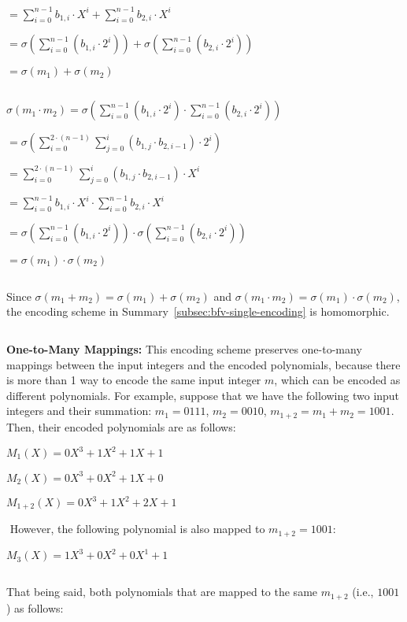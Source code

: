 $= \sum\limits_{i=0}^{n-1} b_{1,i}\cdot X^i + \sum\limits_{i=0}^{n-1} b_{2,i}\cdot X^i$

$= \sigma\left( \sum\limits_{i=0}^{n-1} (b_{1,i} \cdot 2^i)\right) + \sigma\left( \sum\limits_{i=0}^{n-1} (b_{2,i} \cdot 2^i) \right)$

$= \sigma(m_1) + \sigma(m_2)$

$ $

$\sigma (m_1 \cdot m_2) = \sigma\left(\sum\limits_{i=0}^{n-1}(b_{1, i} \cdot 2^i) \cdot \sum\limits_{i=0}^{n-1}(b_{2,i} \cdot 2^i)\right)$

$= \sigma\left(\sum\limits_{i=0}^{2\cdot(n-1)}\sum\limits_{j=0}^{i}(b_{1,j} \cdot b_{2,i-1})\cdot 2^i\right)$

$= \sum\limits_{i=0}^{2\cdot(n-1)}\sum\limits_{j=0}^{i}(b_{1,j} \cdot b_{2,i-1})\cdot X^i$

$ = \sum\limits_{i=0}^{n-1} b_{1,i}\cdot X^i \cdot \sum\limits_{i=0}^{n-1} b_{2,i}\cdot X^i$

$= \sigma\left( \sum\limits_{i=0}^{n-1} (b_{1,i} \cdot 2^i)\right) \cdot \sigma\left( \sum\limits_{i=0}^{n-1} (b_{2,i} \cdot 2^i) \right)$

$= \sigma(m_1) \cdot \sigma(m_2)$

$ $

Since $\sigma (m_1 + m_2) = \sigma(m_1) + \sigma(m_2)$ and $\sigma (m_1 \cdot m_2) = \sigma(m_1) \cdot \sigma(m_2)$, the encoding scheme in Summary~\ref*{subsec:bfv-single-encoding} is homomorphic.


$ $

\textbf{One-to-Many Mappings:} This encoding scheme preserves one-to-many mappings between the input integers and the encoded polynomials, because there is more than 1 way to encode the same input integer $m$, which can be encoded as different polynomials. For example, suppose that we have the following two input integers and their summation: $m_1 = 0111$, $m_2 = 0010$, $m_{1+2} = m_1 + m_2 = 1001$. Then, their encoded polynomials are as follows: 

$M_1(X) = 0X^3 + 1X^2 + 1X + 1$

$M_2(X) = 0X^3 + 0X^2 + 1X + 0$

$M_{1+2}(X) = 0X^3 + 1X^2 + 2X + 1$

$ $
However, the following polynomial is also mapped to $m_{1+2} = 1001$:

$M_{3}(X) = 1X^3 + 0X^2 + 0X^1 + 1$

$ $

That being said, both polynomials that are mapped to the same $m_{1+2}$ (i.e., $1001$) as follows:

